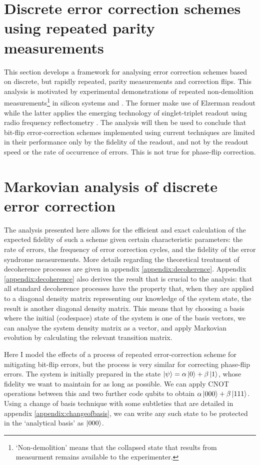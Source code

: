 \documentclass{report}
\begin{document}
\section{Discrete error correction schemes using repeated parity measurements} \label{sec:repeat_analysis}
This section develops a framework for analysing error correction schemes based on discrete, but rapidly repeated, parity measurements and correction flips. This analysis is motivated by experimental demonstrations of repeated non-demolition measurements\footnote{`Non-demolition' means that the collapsed state that results from measurment remains available to the experimenter.} in silicon systems \cite{Xue2020} and \cite{Nakajima2019}. The former make use of Elzerman readout\cite{Elzerman2004} while the latter applies the emerging technology of singlet-triplet readout using radio frequency reflectometry \cite{Oakes2022}. The analysis will then be used to conclude that bit-flip error-correction schemes implemented using current techniques are limited in their performance only by the fidelity of the readout, and not by the readout speed or the rate of occurrence of errors. This is not true for phase-flip correction. 

\section{Markovian analysis of discrete error correction}
The analysis presented here allows for the efficient and exact calculation of the expected fidelity of such a scheme given certain characteristic parameters: the rate of errors, the frequency of error correction cycles, and the fidelity of the error syndrome measurements.
More details regarding the theoretical treatment of decoherence processes are given in appendix \ref{appendix:decoherence}. Appendix \ref{appendix:decoherence} also derives the result that is crucial to the analysis: that all standard decoherence processes have the property that, when they are applied to a diagonal density matrix representing our knowledge of the system state, the result is another diagonal density matrix. This means that by choosing a basis where the initial (codespace) state of the system is one of the basis vectors, we can analyse the system density matrix as a vector, and apply Markovian evolution by calculating the relevant transition matrix. 

Here I model the effects of a process of repeated error-correction scheme for mitigating bit-flip errors, but the process is very similar for correcting phase-flip errors. The system is initially prepared in the state $\ket{\psi} = \alpha \ket{0} + \beta \ket{1}$, whose fidelity we want to maintain for as long as possible. We can apply CNOT operations between this and two further code qubits to obtain $\alpha \ket{000} + \beta \ket{111}$. Using a change of basis technique with some subtleties that are detailed in appendix \ref{appendix:changeofbasis}, we can write any such state to be protected in the `analytical basis' as $\ket{000}$.
\end{document}
